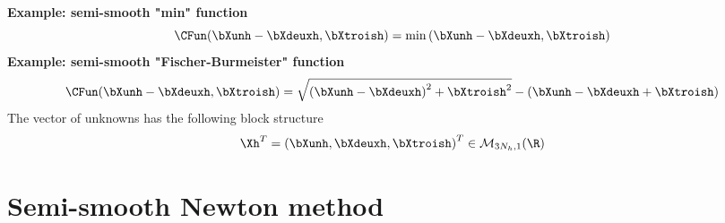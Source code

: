 \documentclass[10 pt]{beamer}
\begin{document}
\begin{frame}
%
\textcolor{cadmiumgreen}{\textbf{ Example: semi-smooth "min" function}} 
\begin{equation*}
\CFun(\bXunh-\bXdeuxh,\bXtroish) =\min \left(\bXunh-\bXdeuxh, \bXtroish\right)
\end{equation*}
\textcolor{cadmiumgreen}{\textbf{Example: semi-smooth "Fischer-Burmeister" function}}
\begin{equation*}
\CFun(\bXunh-\bXdeuxh,\bXtroish)=\sqrt{\left(\bXunh-\bXdeuxh\right)^2 + \bXtroish^2} - (\bXunh-\bXdeuxh + \bXtroish)
\end{equation*}
The vector of unknowns has the following block structure
\begin{equation*}
\Xh^{T}=
\left(\bXunh, \bXdeuxh, \bXtroish\right)^{T} \in \mathcal{M}_{3N_h,1}(\R)
\end{equation*}
\end{frame}
\section{Semi-smooth Newton method}
\end{document}

